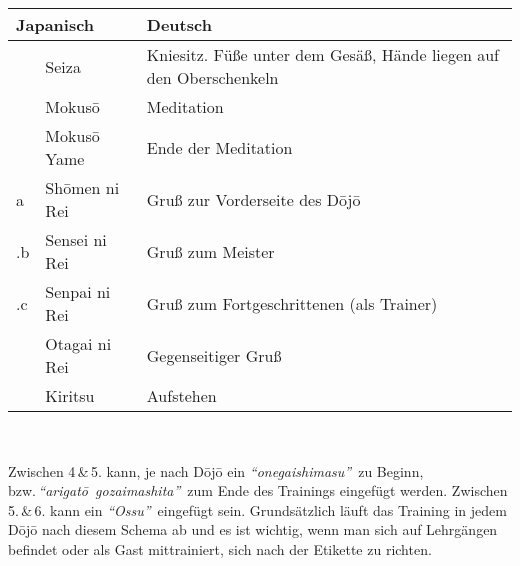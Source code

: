 	\setcounter{num}{0}
	\setcounter{numz}{0}
	\begin{tcolorbox}[width=\textwidth,right=12pt,left=12pt,colframe=lightgray,colback=white,fonttitle=\bfseries,coltitle=black,title=Allgemeines:\indent Trainingsablauf Begrüßung und Ende]
		\null\vfill\null	
		\begin{tabularx}{\textwidth}{llX}
			\multicolumn{2}{l}{\textbf{Japanisch}} 	& \textbf{Deutsch}\\
			\midrule
			\ctu		& Seiza 				& Kniesitz. Füße unter dem Gesäß, Hände liegen auf den Oberschenkeln\\
			\ctu		& Mokus\={o}			& Meditation\\
			\ctu		& Mokus\={o} Yame		& Ende der Meditation\\
			\ctu a		& Sh\={o}men ni Rei		& Gruß zur Vorderseite des D\={o}j\={o}\\
			\thenum .b	& Sensei ni Rei			& Gruß zum Meister\\
			\thenum .c	& Senpai ni Rei			& Gruß zum Fortgeschrittenen (als Trainer)\\
			\ctu		& Otagai ni Rei			& Gegenseitiger Gruß\\
			\ctu		& Kiritsu				& Aufstehen\\		
			\midrule
		\end{tabularx}\\\null\vfill\null
	\end{tcolorbox}
		\begin{center}
			\parbox{\textwidth-2\tabcolsep}{Zwischen 4\,\&\,5. kann, je nach D\={o}j\={o} ein \textit{\textquotedblleft onegaishimasu\textquotedblright}~zu Beginn, bzw.\,\textit{\mbox{\textquotedblleft arigat\={o} gozaimashita\textquotedblright}}~zum Ende des Trainings eingefügt werden. Zwischen 5.\,\&\,6. kann ein \textit{\textquotedblleft Ossu\textquotedblright}~eingefügt sein. Grundsätzlich läuft das Training in jedem D\={o}j\={o} nach diesem Schema ab und es ist wichtig, wenn man sich auf Lehrgängen befindet oder als Gast mittrainiert, sich nach der Etikette zu richten.}
		\end{center}\null\vfill\null
	
